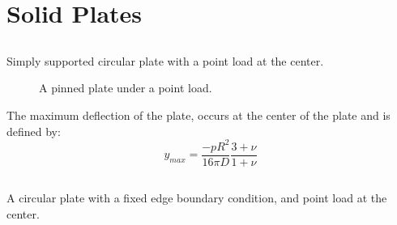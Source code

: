 \documentclass[10pt,letterpaper]{report}
\numberwithin{equation}{chapter}
\begin{document}
\section{Solid Plates}
\label{sec: Solid}


\subsection{}
\label{subsec:ppp} %
Simply supported circular plate with a point load at the center.
\begin{figure}[!ht]
\centering
\label{fig:ppp}
    \hfill
    \caption{A pinned plate under a point load.}
    \label{fig:dummy}
\end{figure}
The maximum deflection of the plate, occurs at the center of the plate and is defined by:
\[y_{max} = \frac{-p R^2}{16 \pi D} \frac{3 + \nu}{1 + \nu}\]

\newpage
\subsection{}
\label{subsec:fpp} %
A circular plate with a fixed edge boundary condition, and point load at the center.
\end{document}
